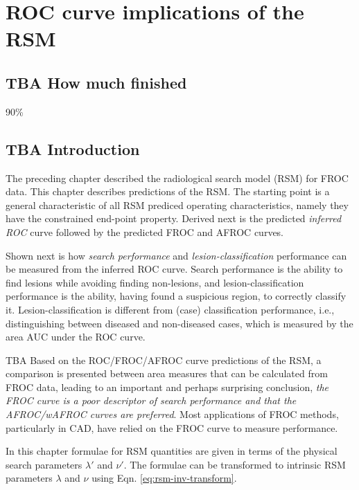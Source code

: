 \documentclass[
]{book}
\begin{document}
\hypertarget{rsm-pred}{%
\chapter{ROC curve implications of the RSM}\label{rsm-pred}}

\hypertarget{rsm-pred-how-much-finished}{%
\section{TBA How much finished}\label{rsm-pred-how-much-finished}}

90\%

\hypertarget{rsm-pred-intro}{%
\section{TBA Introduction}\label{rsm-pred-intro}}

The preceding chapter described the radiological search model (RSM) for FROC data. This chapter describes predictions of the RSM.
The starting point is a general characteristic of all RSM prediced operating characteristics, namely they have the constrained end-point property. Derived next is the predicted \emph{inferred ROC} curve followed by the predicted FROC and AFROC curves.

Shown next is how \emph{search performance} and \emph{lesion-classification} performance can be measured from the inferred ROC curve. Search performance is the ability to find lesions while avoiding finding non-lesions, and lesion-classification performance is the ability, having found a suspicious region, to correctly classify it. Lesion-classification is different from (case) classification performance, i.e., distinguishing between diseased and non-diseased cases, which is measured by the area AUC under the ROC curve.

TBA Based on the ROC/FROC/AFROC curve predictions of the RSM, a comparison is presented between area measures that can be calculated from FROC data, leading to an important and perhaps surprising conclusion, \emph{the FROC curve is a poor descriptor of search performance and that the AFROC/wAFROC curves are preferred}. Most applications of FROC methods, particularly in CAD, have relied on the FROC curve to measure performance.

In this chapter formulae for RSM quantities are given in terms of the physical search parameters \(\lambda'\) and \(\nu'\). The formulae can be transformed to intrinsic RSM parameters \(\lambda\) and \(\nu\) using Eqn. \eqref{eq:rsm-inv-transform}.
\end{document}
